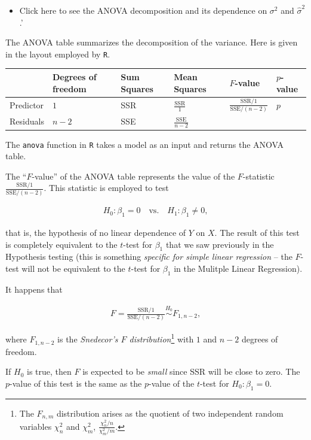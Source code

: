 \documentclass[]{book}
\let\rmarkdownfootnote\footnote%
\def\footnote{\protect\rmarkdownfootnote}
\newenvironment{rmdblock}[1]
  {\begin{shaded*}
  \begin{itemize}
  \renewcommand{\labelitemi}{
    \raisebox{-.7\height}[0pt][0pt]{
      {\setkeys{Gin}{width=2em,keepaspectratio}\texttt{[image: img/icons/\#1]}}
    }
  }
  \item
  }
  {
  \end{itemize}
  \end{shaded*}
  }
\newenvironment{rmdinsight}
  {\begin{rmdblock}{insight}}
  {\end{rmdblock}}
\begin{document}
\begin{rmdinsight}
Click here to see the ANOVA decomposition and its dependence on
\(\sigma^2\) and \(\hat\sigma^2\).'
\end{rmdinsight}

The ANOVA table summarizes the decomposition of the variance. Here is
given in the layout employed by \texttt{R}.

\begin{longtable}[]{@{}llllll@{}}
\toprule
& Degrees of freedom & Sum Squares & Mean Squares & \(F\)-value &
\(p\)-value\tabularnewline
\midrule
\endhead
Predictor & \(1\) & SSR & \(\frac{\text{SSR}}{1}\) &
\(\frac{\text{SSR}/1}{\text{SSE}/(n-2)}\) & \(p\)\tabularnewline
Residuals & \(n - 2\) & SSE & \(\frac{\text{SSE}}{n-2}\) &
&\tabularnewline
\bottomrule
\end{longtable}

The \texttt{anova} function in \texttt{R} takes a model as an input and
returns the ANOVA table.

The ``\(F\)-value'' of the ANOVA table represents the value of the
\(F\)-statistic \(\frac{\text{SSR}/1}{\text{SSE}/(n-2)}\). This
statistic is employed to test

\begin{align*}
H_0:\beta_1=0\quad\text{vs.}\quad H_1:\beta_1\neq 0,
\end{align*}

that is, the hypothesis of no linear dependence of \(Y\) on \(X\). The
result of this test is completely equivalent to the \(t\)-test for
\(\beta_1\) that we saw previously in the Hypothesis testing (this is
something \emph{specific for simple linear regression} -- the \(F\)-test
will not be equivalent to the \(t\)-test for \(\beta_1\) in the Mulitple
Linear Regression).

It happens that

\begin{align*}
F=\frac{\text{SSR}/1}{\text{SSE}/(n-2)}\stackrel{H_0}{\sim} F_{1,n-2},
\end{align*}

where \(F_{1,n-2}\) is the \emph{Snedecor's \(F\)
distribution}\footnote{The \(F_{n,m}\) distribution arises as the
  quotient of two independent random variables \(\chi^2_n\) and
  \(\chi^2_m\), \(\frac{\chi^2_n/n}{\chi^2_m/m}\).} with \(1\) and
\(n-2\) degrees of freedom.

If \(H_0\) is true, then \(F\) is expected to be \emph{small} since SSR
will be close to zero. The \(p\)-value of this test is the same as the
\(p\)-value of the \(t\)-test for \(H_0:\beta_1=0\).
\end{document}
